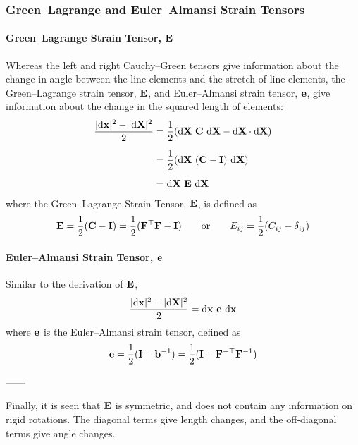 \documentclass[12pt, a4paper]{article}
\numberwithin{equation}{section}
\begin{document}
\subsubsection{Green--Lagrange and Euler--Almansi Strain Tensors} 

\paragraph{Green--Lagrange Strain Tensor, $\bf E$} Whereas the left and right Cauchy--Green tensors give information about the change in angle between the line elements and the stretch of line elements, the Green--Lagrange strain tensor, $\bf E$, and Euler--Almansi strain tensor, $\mathbf{e}$, give information about the change in the squared length of elements:
\begin{align}
    \frac{\vert \mathrm{d} {\bf x} \vert^2 - \vert \mathrm{d} {\bf X} \vert^2}{2} 
    & = \frac{1}{2} (\mathrm{d} {\bf X} \ \bC \ \mathrm{d} {\bf X} - \mathrm{d} {\bf X} \cdot \mathrm{d} {\bf X}) \nonumber \\[.5em]
    & =  \frac{1}{2} (\mathrm{d} {\bf X} \ (\bC - {\bf I}) \ \mathrm{d} {\bf X}) \nonumber \\[.5em]
    & = \mathrm{d} {\bf X} \ \bE\ \mathrm{d} {\bf X}   
\end{align}
where the Green--Lagrange Strain Tensor, $\mathbf{E}$, is defined as
\begin{equation}
\label{eqn:green_lagrange}
    \mathbf{E} = \frac{1}{2} (\mathbf{C} - \mathbf{I}) = \frac{1}{2} (\mathbf{F}^\top \mathbf{F} - \mathbf{I})
    \quad \quad \text{or} \quad \quad
    E_{ij} = \frac{1}{2} (C_{ij} - \delta_{ij})
\end{equation}

\paragraph{Euler--Almansi Strain Tensor, $\mathbf{e}$} Similar to the derivation of $\bf E$, 
\begin{equation}
    \frac{\vert \mathrm{d} {\bf x} \vert^2 - \vert \mathrm{d} {\bf X} \vert^2}{2} = \mathrm{d} {\bf x} \ \be \ \mathrm{d} {\bf x}
\end{equation}
where $\mathbf{e}$ is the Euler--Almansi strain tensor, defined as
\begin{equation}
    \mathbf{e}= \frac{1}{2} ({\bf I} - \mathbf{b}^{-1}) = \frac{1}{2} ({\bf I} - \mathbf{F}^{-\top} \mathbf{F}^{-1})
\end{equation}

------

Finally, it is seen that $\mathbf{E}$ is symmetric, and does not contain any information on rigid rotations. The diagonal terms give length changes, and the off-diagonal terms give angle changes.\\
\end{document}
